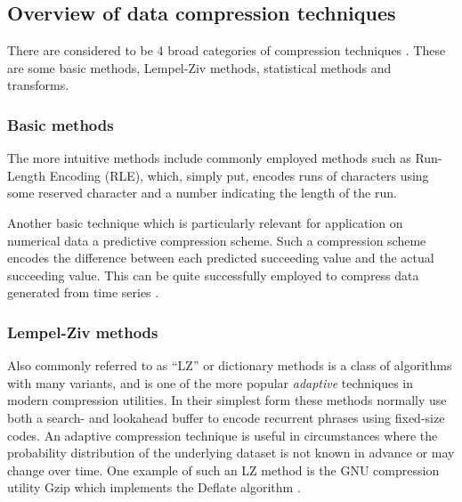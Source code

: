 \documentclass{acm_proc_article-sp}
\begin{document}
\subsection{Overview of data compression techniques}
There are considered to be 4 broad categories of compression techniques \cite{salomon2004data}. These are some basic methods, Lempel-Ziv methods, statistical methods 
and transforms.
\subsubsection{Basic methods}
The more intuitive methods include commonly employed methods such as Run-Length Encoding (RLE), which, simply put, encodes runs of characters using some reserved 
character and a number indicating the length of the run.

Another basic technique which is particularly relevant for application on numerical data a predictive compression scheme. Such a compression scheme encodes the 
difference between each predicted succeeding value and the actual succeeding value. This can be quite successfully employed to compress data generated from time series \cite{engelson2000lossless}.
\subsubsection{Lempel-Ziv methods}
Also commonly referred to as “LZ” or dictionary methods is a class of algorithms with many variants, and is one of the more popular \textit{adaptive} techniques in modern 
compression utilities. In their simplest form these methods normally use both a search- and lookahead buffer to encode recurrent phrases using fixed-size codes. An 
adaptive compression technique is useful in circumstances where the probability distribution of the underlying dataset is not known in advance or may change over time. 
One example of such an LZ method is the GNU compression utility Gzip which implements the Deflate algorithm \cite[ch. 3]{salomon2004data}.
\end{document}
